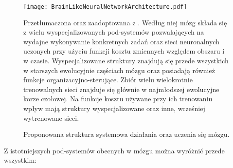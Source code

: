 \begin{figure}[ht]
	\texttt{[image: BrainLikeNeuralNetworkArchitecture.pdf]}
	\caption{Proponowana struktura systemowa działania oraz uczenia się mózgu.}
	Przetłumaczona oraz zaadoptowana z \cite{marblestone2016toward}.
	Według niej mózg składa się z wielu wyspecjalizowanych pod-systemów pozwalających na wydajne wykonywanie konkretnych zadań oraz sieci neuronalnych uczonych przy użyciu funkcji kosztu zmiennych względem obszaru i w czasie.
	Wyspecjalizowane struktury znajdują się przede wszystkich w starszych ewolucyjnie częściach mózgu oraz posiadają również funkcje organizacyjno-sterujące.
	Zbiór wielu wielokrotnie trenowalnych sieci znajduje się głównie w najmłodszej ewolucyjne korze czołowej.
	Na funkcje kosztu używane przy ich trenowaniu wpływ mają struktury wyspecjalizowane oraz inne, wcześniej wytrenowane sieci.
	\label{fig:structure-with-specialized-systems}
\end{figure}

Z istotniejszych pod-systemów obecnych w mózgu można wyróżnić przede wszystkim:

